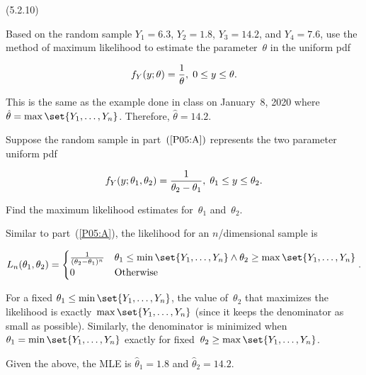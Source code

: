 \begin{problem}
  (\textnormal{5.2.10})
\end{problem}

\begin{subproblem}\label{P05:A}
  Based on the random sample ${Y_1=6.3}$, ${Y_2 = 1.8}$, ${Y_3 = 14.2}$, and ${Y_4 = 7.6}$, use the method of maximum likelihood to estimate the parameter~$\theta$ in the uniform pdf

  \begin{equation}
    f_{Y}(y;\theta) = \frac{1}{\theta}, \hspace{0.1cm} 0 \leq y \leq \theta \text{.}
  \end{equation}
\end{subproblem}

This is the same as the example done in class on January~8, 2020 where ${\hat{\theta} = \max\set{Y_1,\ldots,Y_{n}}}$.  Therefore, $\boxed{{\hat{\theta} = 14.2}}$.

\begin{subproblem}
  Suppose the random sample in part~$(\ref{P05:A})$ represents the two parameter uniform pdf

  \begin{equation}\label{eq:P05:b}
    f_{Y}(y;\theta_1,\theta_2) = \frac{1}{\theta_2 - \theta_1}, \hspace{0.1cm} \theta_{1} \leq y \leq \theta_{2} \text{.}
  \end{equation}

  \noindent
  Find the maximum likelihood estimates for~$\theta_1$ and~$\theta_{2}$.
\end{subproblem}

Similar to part~(\ref{P05:A}), the likelihood for an $n$\-/dimensional sample is

\begin{equation}
  L_{n}(\theta_{1},\theta_{2}) =  \begin{cases}
                                    \frac{1}{(\theta_{2} - \theta_{1})^{n}} & \theta_{1} \leq \min\set{Y_1,\ldots,Y_n} \wedge \theta_2 \geq \max\set{Y_1,\ldots,Y_n} \\
                                    0 & \text{Otherwise}
                                  \end{cases}\text{.}
\end{equation}

\noindent
For a fixed ${\theta_{1} \leq \min\set{Y_{1},\ldots,Y_{n}}}$, the value of~$\theta_{2}$ that maximizes the likelihood is exactly~${\max\set{Y_1,\ldots,Y_n}}$ (since it keeps the denominator as small as possible).  Similarly, the denominator is minimized when ${\theta_{1} = \min\set{Y_{1},\ldots,Y_{n}}}$ exactly for fixed~${\theta_{2} \geq \max\set{Y_{1},\ldots,Y_{n}}}$.

Given the above, the MLE is $\boxed{{\hat{\theta}_{1}=1.8}}$ and $\boxed{{\hat{\theta}_{2} = 14.2}}$.
